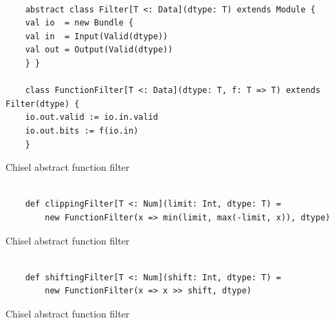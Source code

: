 \begin{listing}[ht]
    \begin{verbatim}

    abstract class Filter[T <: Data](dtype: T) extends Module {
    val io  = new Bundle {
    val in  = Input(Valid(dtype))
    val out = Output(Valid(dtype))
    } }

    class FunctionFilter[T <: Data](dtype: T, f: T => T) extends Filter(dtype) {
    io.out.valid := io.in.valid
    io.out.bits := f(io.in)
    }

    \end{verbatim}
    \caption{Chisel abstract function filter}
    \label{listing:chisel_example}
\end{listing}


\begin{listing}[ht]
    \begin{verbatim}

    def clippingFilter[T <: Num](limit: Int, dtype: T) =
        new FunctionFilter(x => min(limit, max(-limit, x)), dtype)

    \end{verbatim}
    \caption{Chisel abstract function filter}
    \label{listing:chisel_example}
\end{listing}

\begin{listing}[ht]
    \begin{verbatim}

    def shiftingFilter[T <: Num](shift: Int, dtype: T) =
        new FunctionFilter(x => x >> shift, dtype)

    \end{verbatim}
    \caption{Chisel abstract function filter}
    \label{listing:chisel_example}
\end{listing}





